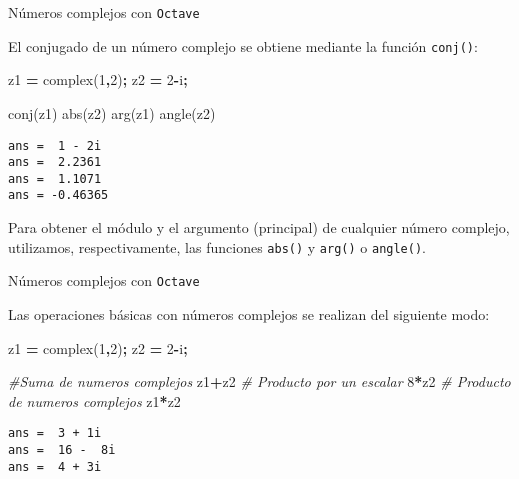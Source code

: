 \documentclass[
  ignorenonframetext,
]{beamer}
\newenvironment{Shaded}{\begin{snugshade}}{\end{snugshade}}
\newcommand{\CommentTok}[1]{\textcolor[rgb]{0.56,0.35,0.01}{\textit{#1}}}
\newcommand{\FloatTok}[1]{\textcolor[rgb]{0.00,0.00,0.81}{#1}}
\newcommand{\FunctionTok}[1]{\textcolor[rgb]{0.00,0.00,0.00}{#1}}
\newcommand{\NormalTok}[1]{#1}
\newcommand{\OperatorTok}[1]{\textcolor[rgb]{0.81,0.36,0.00}{\textbf{#1}}}
\begin{document}
\begin{frame}[fragile]{Números complejos con \texttt{Octave}}
\protect\hypertarget{nuxfameros-complejos-con-octave-3}{}

El conjugado de un número complejo se obtiene mediante la función
\texttt{conj()}:

\begin{Shaded}
\begin{Highlighting}[]
\NormalTok{z1 }\OperatorTok{=} \FunctionTok{complex}\NormalTok{(}\FloatTok{1}\OperatorTok{,}\FloatTok{2}\NormalTok{)}\OperatorTok{;}
\NormalTok{z2 }\OperatorTok{=} \FloatTok{2}\OperatorTok{-}\FunctionTok{i}\OperatorTok{;}

\FunctionTok{conj}\NormalTok{(z1)}
\FunctionTok{abs}\NormalTok{(z2)}
\FunctionTok{arg}\NormalTok{(z1)}
\FunctionTok{angle}\NormalTok{(z2)}
\end{Highlighting}
\end{Shaded}

\begin{verbatim}
ans =  1 - 2i
ans =  2.2361
ans =  1.1071
ans = -0.46365
\end{verbatim}

Para obtener el módulo y el argumento (principal) de cualquier número
complejo, utilizamos, respectivamente, las funciones \texttt{abs()} y
\texttt{arg()} o \texttt{angle()}.

\end{frame}

\begin{frame}[fragile]{Números complejos con \texttt{Octave}}
\protect\hypertarget{nuxfameros-complejos-con-octave-4}{}

Las operaciones básicas con números complejos se realizan del siguiente
modo:

\begin{Shaded}
\begin{Highlighting}[]
\NormalTok{z1 }\OperatorTok{=} \FunctionTok{complex}\NormalTok{(}\FloatTok{1}\OperatorTok{,}\FloatTok{2}\NormalTok{)}\OperatorTok{;}
\NormalTok{z2 }\OperatorTok{=} \FloatTok{2}\OperatorTok{-}\FunctionTok{i}\OperatorTok{;}

\CommentTok{#Suma de numeros complejos}
\NormalTok{z1}\OperatorTok{+}\NormalTok{z2}
\CommentTok{# Producto por un escalar}
\FloatTok{8}\OperatorTok{*}\NormalTok{z2}
\CommentTok{# Producto de numeros complejos}
\NormalTok{z1}\OperatorTok{*}\NormalTok{z2}
\end{Highlighting}
\end{Shaded}

\begin{verbatim}
ans =  3 + 1i
ans =  16 -  8i
ans =  4 + 3i
\end{verbatim}

\end{frame}
\end{document}
